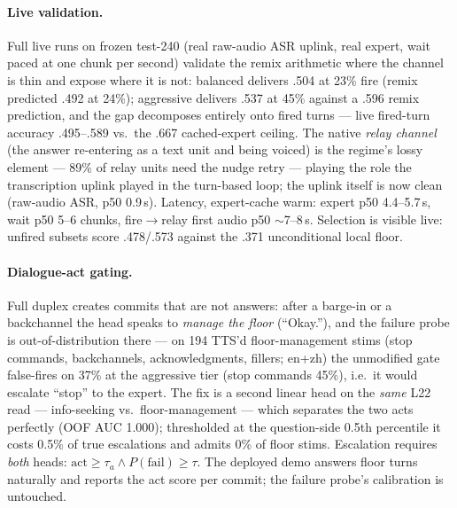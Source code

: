 \paragraph{Live validation.} Full live runs on frozen test-240 (real
raw-audio ASR uplink, real expert, wait paced at one chunk per second)
validate the remix arithmetic where the channel is thin and expose
where it is not: balanced delivers .504 at 23\% fire (remix predicted
.492 at 24\%); aggressive delivers .537 at 45\% against a .596 remix
prediction, and the gap decomposes entirely onto fired turns ---
live fired-turn accuracy .495--.589 vs.\ the .667 cached-expert
ceiling. The native \emph{relay channel} (the answer re-entering as a
text unit and being voiced) is the regime's lossy element --- 89\% of
relay units need the nudge retry --- playing the role the
transcription uplink played in the turn-based loop; the uplink itself
is now clean (raw-audio ASR, p50 0.9\,s). Latency, expert-cache warm:
expert p50 4.4--5.7\,s, wait p50 5--6 chunks, fire$\to$relay first
audio p50 $\sim$7--8\,s. Selection is visible live: unfired subsets
score .478/.573 against the .371 unconditional local floor.

\paragraph{Dialogue-act gating.} Full duplex creates commits that are
not answers: after a barge-in or a backchannel the head speaks to
\emph{manage the floor} (``Okay.''), and the failure probe is
out-of-distribution there --- on 194 TTS'd floor-management stims
(stop commands, backchannels, acknowledgments, fillers; en+zh) the
unmodified gate false-fires on 37\% at the aggressive tier (stop
commands 45\%), i.e.\ it would escalate ``stop'' to the expert. The
fix is a second linear head on the \emph{same} L22 read ---
info-seeking vs.\ floor-management --- which separates the two acts
perfectly (OOF AUC 1.000); thresholded at the question-side 0.5th
percentile it costs 0.5\% of true escalations and admits 0\% of floor
stims. Escalation requires \emph{both} heads:
$\mathrm{act}\ge\tau_a \wedge P(\mathrm{fail})\ge\tau$. The deployed
demo answers floor turns naturally and reports the act score per
commit; the failure probe's calibration is untouched.

